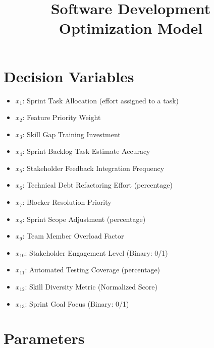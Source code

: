 \documentclass{article}
\begin{document}
\title{Software Development Optimization Model}
\date{}
\maketitle

\section{Decision Variables}

\begin{itemize}
    \item $x_1$: Sprint Task Allocation (effort assigned to a task)
    \item $x_2$: Feature Priority Weight
    \item $x_3$: Skill Gap Training Investment
    \item $x_4$: Sprint Backlog Task Estimate Accuracy
    \item $x_5$: Stakeholder Feedback Integration Frequency
    \item $x_6$: Technical Debt Refactoring Effort (percentage)
    \item $x_7$: Blocker Resolution Priority
    \item $x_8$: Sprint Scope Adjustment (percentage)
    \item $x_9$: Team Member Overload Factor
    \item $x_{10}$: Stakeholder Engagement Level (Binary: 0/1)
    \item $x_{11}$: Automated Testing Coverage (percentage)
    \item $x_{12}$: Skill Diversity Metric (Normalized Score)
    \item $x_{13}$: Sprint Goal Focus (Binary: 0/1)
\end{itemize}

\section{Parameters}
\end{document}
